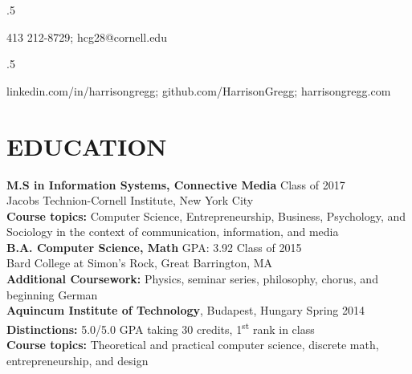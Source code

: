 \documentclass{res}
\begin{document}
 
\thispagestyle{empty} %

\begin{resume}
\vspace{0.1in}
\moveleft.5\sectionwidth\centerline{413 212-8729; hcg28@cornell.edu}  
\moveleft.5\sectionwidth\centerline{linkedin.com/in/harrisongregg; github.com/HarrisonGregg; harrisongregg.com}  

\section{EDUCATION}
 	{\bf M.S in Information Systems, Connective Media} \hfill Class of 2017\\
 	Jacobs Technion-Cornell Institute, New York City\\
 	{\bf Course topics:} Computer Science, Entrepreneurship, Business, Psychology, and Sociology in the context of communication, information, and media
\vspace{2mm}\\
    {\bf B.A. Computer Science, Math} GPA: 3.92 \hfill Class of 2015\\
    Bard College at Simon's Rock, Great Barrington, MA\\
  {\bf Additional Coursework:}
Physics, seminar series, philosophy, chorus, and beginning German
\vspace{2mm}\\
    {\bf Aquincum Institute of Technology}, Budapest, Hungary \hfill Spring 2014\\  
  {\bf Distinctions:}
    5.0/5.0 GPA taking 30 credits, 1\textsuperscript{st} rank in class\\
  {\bf Course topics:}
  	Theoretical and practical computer science, discrete math, entrepreneurship, and design


\end{resume}
\end{document}
